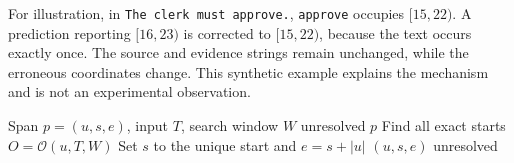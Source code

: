 For illustration, in \texttt{The clerk must approve.}, \texttt{approve} occupies \([15,22)\). A prediction reporting \([16,23)\) is corrected to \([15,22)\), because the text occurs exactly once. The source and evidence strings remain unchanged, while the erroneous coordinates change. This synthetic example explains the mechanism and is not an experimental observation.

\begin{algorithm}[t]
\caption{Historical unique-exact evidence alignment}
\label{alg:legacy-grounding}
\begin{algorithmic}[1]
\REQUIRE Span \(p=(u,s,e)\), input \(T\), search window \(W\)
    \RETURN unresolved
\ENDIF
{}
    \RETURN \(p\)
\ENDIF
\STATE Find all exact starts \(O=\mathcal{O}(u,T,W)\)
    \STATE Set \(s\) to the unique start and \(e=s+|u|\)
    \RETURN \((u,s,e)\)
\ENDIF
\RETURN unresolved
\end{algorithmic}
\end{algorithm}
